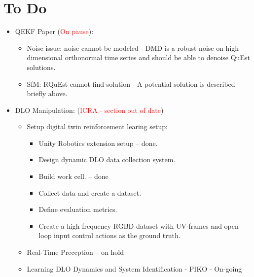 \documentclass[11pt]{article}
\begin{document}
\section{To Do}
\begin{itemize}
  \item QEKF Paper (\textcolor{red}{On pause}):
  \begin{itemize}
      \item Noise issue: noise cannot be modeled - DMD is a robust noise on high dimensional orthonormal time series and should be able to denoise QuEst solutions.
      \item SfM: RQuEst cannot find solution - A potential solution is described  briefly above.
  \end{itemize}
  \item  DLO Manipulation: (\textcolor{red}{ICRA - section out of date})
  \begin{itemize}
      \item Setup digital twin reinforcement learing setup:
      \begin{itemize}
        \item Unity Robotics extension setup -- done.
        \item Design dynamic DLO data collection system.
        \item Build work cell. -- done
        \item Collect data and create a dataset.
        \item Define evaluation metrics.
        \item Create a high frequency RGBD dataset with UV-frames and open-loop input control actions as the ground truth.
      \end{itemize}
      \item Real-Time Preception -- on hold
      \item Learning DLO Dynamics and System Identification - PIKO - On-going
  \end{itemize}
\end{itemize}

\newpage
\end{document}
